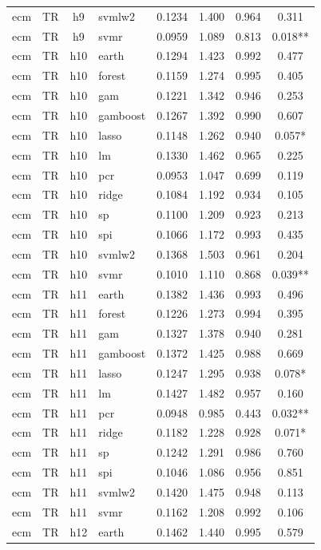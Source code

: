 \begin{ThreePartTable}
\begin{longtable}[t]{llclcccc}
ecm & TR & h9 & svmlw2 & 0.1234 & 1.400 & 0.964 & 0.311\\
ecm & TR & h9 & svmr & 0.0959 & 1.089 & 0.813 & 0.018**\\
\addlinespace
ecm & TR & h10 & earth & 0.1294 & 1.423 & 0.992 & 0.477\\
ecm & TR & h10 & forest & 0.1159 & 1.274 & 0.995 & 0.405\\
ecm & TR & h10 & gam & 0.1221 & 1.342 & 0.946 & 0.253\\
ecm & TR & h10 & gamboost & 0.1267 & 1.392 & 0.990 & 0.607\\
ecm & TR & h10 & lasso & 0.1148 & 1.262 & 0.940 & 0.057*\\
ecm & TR & h10 & lm & 0.1330 & 1.462 & 0.965 & 0.225\\
ecm & TR & h10 & pcr & 0.0953 & 1.047 & 0.699 & 0.119\\
ecm & TR & h10 & ridge & 0.1084 & 1.192 & 0.934 & 0.105\\
ecm & TR & h10 & sp & 0.1100 & 1.209 & 0.923 & 0.213\\
ecm & TR & h10 & spi & 0.1066 & 1.172 & 0.993 & 0.435\\
ecm & TR & h10 & svmlw2 & 0.1368 & 1.503 & 0.961 & 0.204\\
ecm & TR & h10 & svmr & 0.1010 & 1.110 & 0.868 & 0.039**\\
\addlinespace
ecm & TR & h11 & earth & 0.1382 & 1.436 & 0.993 & 0.496\\
ecm & TR & h11 & forest & 0.1226 & 1.273 & 0.994 & 0.395\\
ecm & TR & h11 & gam & 0.1327 & 1.378 & 0.940 & 0.281\\
ecm & TR & h11 & gamboost & 0.1372 & 1.425 & 0.988 & 0.669\\
ecm & TR & h11 & lasso & 0.1247 & 1.295 & 0.938 & 0.078*\\
ecm & TR & h11 & lm & 0.1427 & 1.482 & 0.957 & 0.160\\
ecm & TR & h11 & pcr & 0.0948 & 0.985 & 0.443 & 0.032**\\
ecm & TR & h11 & ridge & 0.1182 & 1.228 & 0.928 & 0.071*\\
ecm & TR & h11 & sp & 0.1242 & 1.291 & 0.986 & 0.760\\
ecm & TR & h11 & spi & 0.1046 & 1.086 & 0.956 & 0.851\\
ecm & TR & h11 & svmlw2 & 0.1420 & 1.475 & 0.948 & 0.113\\
ecm & TR & h11 & svmr & 0.1162 & 1.208 & 0.992 & 0.106\\
\addlinespace
ecm & TR & h12 & earth & 0.1462 & 1.440 & 0.995 & 0.579\\

\end{longtable}
\end{ThreePartTable}
